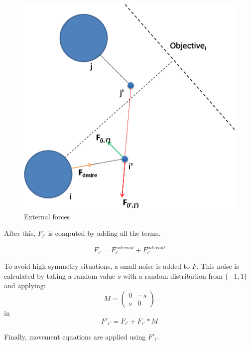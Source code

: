 \documentclass[english]{article}
\begin{document}
\begin{itemize}
\begin{itemize}
            \begin{figure}[H]
                \centering{}
                \includegraphics[scale=0.35]{pics/pedestrian-top-forces}
                \caption{\label{fig:external-forces} External forces}
            \end{figure}

        \end{itemize}

        After this, $F_{i'}$ is computed by adding all the terms.

        \begin{equation}
            F_{i'} = F_{i'}^{external} + F_{i'}^{internal} \label{eq:future-force}
        \end{equation}
        
        To avoid high symmetry situations, a small noise is added to $F$. 
        This noise is calculated by taking a random value $s$ with a random distribution from $\{-1, 1\}$
        and applying:
        \[
            M=\left(\begin{array}{cc}
            0 & -s\\
            s & 0
            \end{array}\right)
        \]
        in
        \[
            F'_{i'} = F_{i'} + F_{i'} * M
        \]
        
        Finally, movement equations are applied using $F'_{i'}$.
    

\end{itemize}
\end{document}
